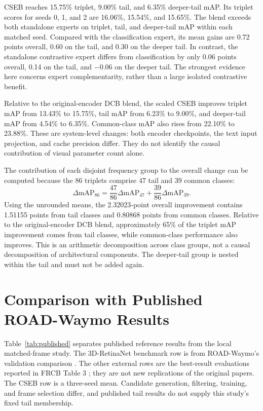 CSEB reaches 15.75\% triplet, 9.00\% tail, and 6.35\% deeper-tail mAP. Its triplet scores for seeds 0, 1, and 2 are 16.06\%, 15.54\%, and 15.65\%. The blend exceeds both standalone experts on triplet, tail, and deeper-tail mAP within each matched seed. Compared with the classification expert, its mean gains are 0.72 points overall, 0.60 on the tail, and 0.30 on the deeper tail. In contrast, the standalone contrastive expert differs from classification by only 0.06 points overall, 0.14 on the tail, and $-0.06$ on the deeper tail. The strongest evidence here concerns expert complementarity, rather than a large isolated contrastive benefit.

Relative to the original-encoder DCB blend, the scaled CSEB improves triplet mAP from 13.43\% to 15.75\%, tail mAP from 6.23\% to 9.00\%, and deeper-tail mAP from 4.54\% to 6.35\%. Common-class mAP also rises from 22.10\% to 23.88\%. These are system-level changes: both encoder checkpoints, the text input projection, and cache precision differ. They do not identify the causal contribution of visual parameter count alone.

The contribution of each disjoint frequency group to the overall change can be computed because the 86 triplets comprise 47 tail and 39 common classes:
\begin{equation}
 \Delta\mathrm{mAP}_{86}=\frac{47}{86}\Delta\mathrm{mAP}_{47}
 +\frac{39}{86}\Delta\mathrm{mAP}_{39}.
\end{equation}
Using the unrounded means, the 2.32023-point overall improvement contains 1.51155 points from tail classes and 0.80868 points from common classes. Relative to the original-encoder DCB blend, approximately 65\% of the triplet mAP improvement comes from tail classes, while common-class performance also improves. This is an arithmetic decomposition across class groups, not a causal decomposition of architectural components. The deeper-tail group is nested within the tail and must not be added again.

\section{Comparison with Published ROAD-Waymo Results}

Table~\ref{tab:published} separates published reference results from the local matched-frame study. The 3D-RetinaNet benchmark row is from ROAD-Waymo's validation comparison \cite{road-waymo}. The other external rows are the best-result evaluations reported in FRCB Table 3 \cite{frcb}; they are not new replications of the original papers. The CSEB row is a three-seed mean. Candidate generation, filtering, training, and frame selection differ, and published tail results do not supply this study's fixed tail membership.


